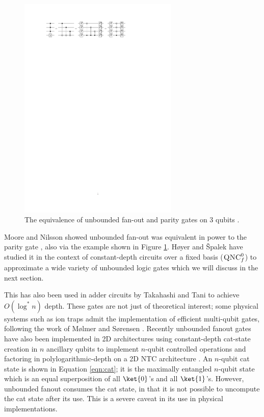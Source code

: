 \begin{center}
\begin{figure}
\includegraphics[width=3in]{figures/fanout.pdf}
\caption{The equivalence of unbounded fan-out and parity gates on 3 qubits \cite{Hoyer2002}.}
\label{fig:fanout}
\end{figure}
\end{center}

Moore and Nilsson showed unbounded fan-out was equivalent in power to the parity gate
\cite{Moore1998}, also via the example shown in Figure \ref{fig:fanout}.
H{\o}yer and {\v S}palek have studied it in the
context of constant-depth circuits over a fixed basis ($\textsc{QNC}_f^0$)
to approximate a wide variety of unbounded logic gates \cite{Hoyer2002} which
we will discuss in the next section.

This has also been used in adder circuits by Takahashi and Tani
\cite{Takahashi2009} to achieve $O(\log^* n)$ depth.
These gates are not just of theoretical interest; some physical systems
such as ion traps admit the implementation of efficient multi-qubit gates,
following the work of M{\o}lmer and S{\o}rensen \cite{Sorensen1999}.
Recently unbounded fanout gates have also been implemented in 2D architectures using
constant-depth cat-state creation in $n$ ancillary qubits to
implement $n$-qubit controlled operations \cite{Rosenbaum2012} and
factoring in polylogarithmic-depth on a \textsc{2D NTC} architecture
\cite{Pham2012b}.
An $n$-qubit cat state is shown in Equation \ref{eqn:cat}; it is the
maximally entangled $n$-qubit state which is an equal superposition of all
$\ket{0}$'s and all $\ket{1}$'s.
However, unbounded fanout consumes the cat state,
in that it is not possible to uncompute the cat state after its use. This is
a severe caveat in its use in physical implementations.

